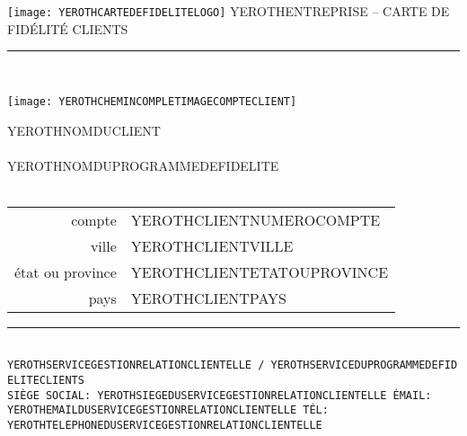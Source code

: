 \documentclass[11pt,a4paper]{memoir}
\begin{document}
    \begin{Spacing}{0.75}%
    \noindent
	\texttt{[image: YEROTHCARTEDEFIDELITELOGO]}
	{\tiny \emptyset \hfill \textcolor{yerothColorGold}{YEROTHENTREPRISE -- CARTE DE FID\'ELIT\'E CLIENTS}}\\
    \vspace{-0.25em}
    \rule{74mm}{.3mm}\\
    \begin{minipage}[t]{33mm}
        \vspace{-0mm}%
        \texttt{[image: YEROTHCHEMINCOMPLETIMAGECOMPTECLIENT]}
    \end{minipage}
    \hspace{1mm}
    \begin{minipage}[t]{42mm}
        \vspace{-0mm}%
        \begin{flushleft}
        {\scriptsize
            \begin{Spacing}{1}%
            \textcolor{yerothColorGold}{YEROTHNOMDUCLIENT} \\
            \hspace{5mm} \\
            \hspace{5mm} YEROTHNOMDUPROGRAMMEDEFIDELITE \\
            \hspace{5mm} \vspace{2mm}\\
            \end{Spacing}
        }
        {\tiny
        	\begin{tabular}{rl}
            	{\color{gray}compte} & YEROTHCLIENTNUMEROCOMPTE \\
            	{\color{gray}ville} & YEROTHCLIENTVILLE \\
            	{\color{gray}\'etat ou province} & YEROTHCLIENTETATOUPROVINCE \\
            	{\color{gray}pays} & YEROTHCLIENTPAYS \\
            \end{tabular}
            \vspace*{3mm}
        }
        \end{flushleft}
    \end{minipage}
    \rule{74mm}{0mm}\\
    \vspace{-0.45em}
    \hspace*{-0.4em}
    \texttt{\fontsize{1.83mm}{3.55mm}\selectfont YEROTHSERVICEGESTIONRELATIONCLIENTELLE~/~YEROTHSERVICEDUPROGRAMMEDEFIDELITECLIENTS \\
    \hspace*{-0.54em}
    \texttt{\fontsize{1.83mm}{3.55mm}\selectfont SI\`EGE SOCIAL: YEROTHSIEGEDUSERVICEGESTIONRELATIONCLIENTELLE \bullet{} \'EMAIL: YEROTHEMAILDUSERVICEGESTIONRELATIONCLIENTELLE \bullet{} T\'EL: YEROTHTELEPHONEDUSERVICEGESTIONRELATIONCLIENTELLE}}
    \end{Spacing}
\end{document}
